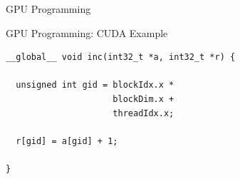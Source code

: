 \documentclass[xcolor=dvipsnames]{beamer}
\begin{document}
\begin{frame}{GPU Programming}
\begin{center}



\end{center}

\end{frame}

%
\begin{frame}[fragile]{GPU Programming: CUDA Example}

\begin{block}{}
\begin{verbatim} 
__global__ void inc(int32_t *a, int32_t *r) {
  
  unsigned int gid = blockIdx.x * 
                     blockDim.x + 
                     threadIdx.x;

  r[gid] = a[gid] + 1; 

} 
\end{verbatim}
\end{block} 


\end{frame} 
\end{document}
